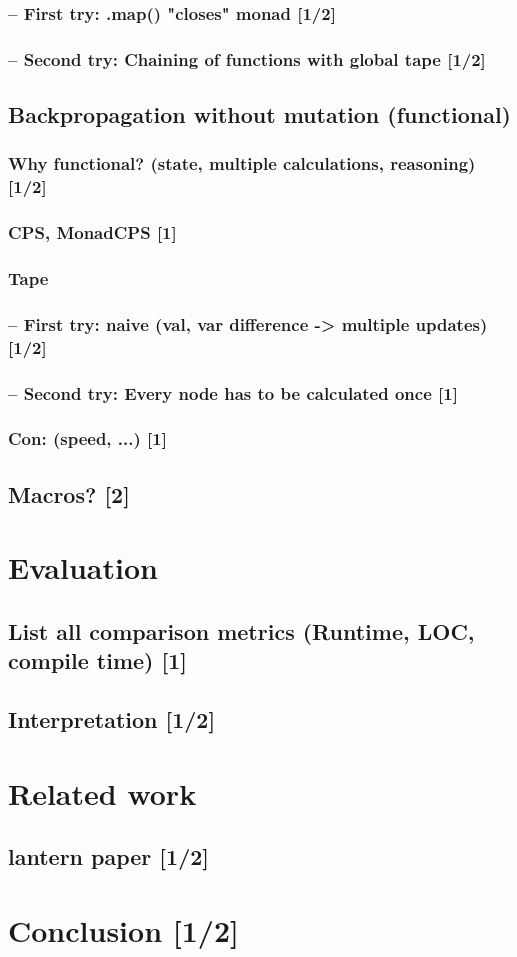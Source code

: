 \documentclass[
	english,
	class=report,custommargins=true,marginpar=false,
	accentcolor=9c,%
	thesis={type=bachelor},%
	fontsize=11pt,%
]{tudapub}
\begin{document}
\subsection{ -- First try: .map() "closes" monad [1/2] }
\subsection{ -- Second try: Chaining of functions with global tape [1/2]}

\section{Backpropagation without mutation (functional)}
\subsection{Why functional? (state, multiple calculations, reasoning) [1/2]}
\subsection{CPS, MonadCPS [1]}
\subsection{Tape}
\subsection{ -- First try: naive (val, var difference -> multiple updates) [1/2]}
\subsection{ -- Second try: Every node has to be calculated once [1]}
\subsection{Con: (speed, ...) [1]}

\section{Macros? [2]}


\chapter{Evaluation}
\section{List all comparison metrics (Runtime, LOC, compile time) [1]}
\section{Interpretation [1/2]}
\chapter{Related work}
\section{lantern paper [1/2]}

\chapter{Conclusion [1/2]}



\printbibliography
\end{document}
